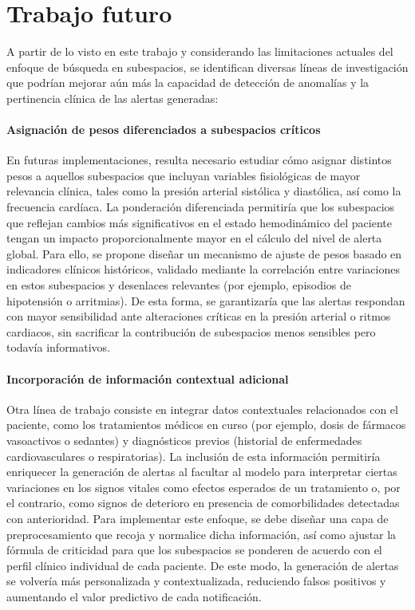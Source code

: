 \section{Trabajo futuro}

A partir de lo visto en este trabajo y considerando las limitaciones actuales del enfoque de búsqueda en subespacios, se identifican diversas líneas de investigación que podrían mejorar aún más la capacidad de detección de anomalías y la pertinencia clínica de las alertas generadas:

\paragraph{Asignación de pesos diferenciados a subespacios críticos}
En futuras implementaciones, resulta necesario estudiar cómo asignar distintos pesos a aquellos subespacios que incluyan variables fisiológicas de mayor relevancia clínica, tales como la presión arterial sistólica y diastólica, así como la frecuencia cardíaca. La ponderación diferenciada permitiría que los subespacios que reflejan cambios más significativos en el estado hemodinámico del paciente tengan un impacto proporcionalmente mayor en el cálculo del nivel de alerta global. Para ello, se propone diseñar un mecanismo de ajuste de pesos basado en indicadores clínicos históricos, validado mediante la correlación entre variaciones en estos subespacios y desenlaces relevantes (por ejemplo, episodios de hipotensión o arritmias). De esta forma, se garantizaría que las alertas respondan con mayor sensibilidad ante alteraciones críticas en la presión arterial o ritmos cardiacos, sin sacrificar la contribución de subespacios menos sensibles pero todavía informativos.

\paragraph{Incorporación de información contextual adicional}
Otra línea de trabajo consiste en integrar datos contextuales relacionados con el paciente, como los tratamientos médicos en curso (por ejemplo, dosis de fármacos vasoactivos o sedantes) y diagnósticos previos (historial de enfermedades cardiovasculares o respiratorias). La inclusión de esta información permitiría enriquecer la generación de alertas al facultar al modelo para interpretar ciertas variaciones en los signos vitales como efectos esperados de un tratamiento o, por el contrario, como signos de deterioro en presencia de comorbilidades detectadas con anterioridad. Para implementar este enfoque, se debe diseñar una capa de preprocesamiento que recoja y normalice dicha información, así como ajustar la fórmula de criticidad para que los subespacios se ponderen de acuerdo con el perfil clínico individual de cada paciente. De este modo, la generación de alertas se volvería más personalizada y contextualizada, reduciendo falsos positivos y aumentando el valor predictivo de cada notificación.

